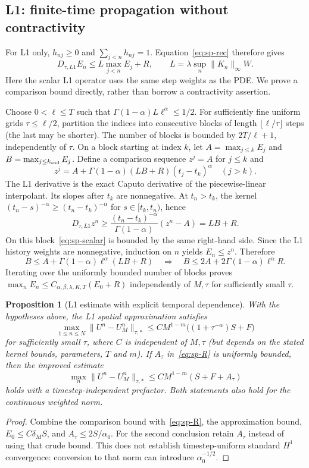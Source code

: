\documentclass[11pt,a4paper]{amsart}
\theoremstyle{remark}
\theoremstyle{plain}
\newtheorem{proposition}{Proposition}[section]
\theoremstyle{remark}
\numberwithin{equation}{section}
\begin{document}
\subsection{L1: finite-time propagation without contractivity}
For L1 only, $h_{nj}\ge0$ and $\sum_{j<n}h_{nj}=1$. Equation~\eqref{eq:sp-rec} therefore gives
\begin{equation}\label{eq:sp-scalar}
 D_{\tau,L1}E_n\le L\max_{j<n}E_j+R,\qquad L=\lambda\sup_n\|K_n\|_\infty W.
\end{equation}
Here the scalar L1 operator uses the same step weights as the PDE. We prove a comparison bound directly, rather than borrow a contractivity assertion.

Choose $0<\ell\le T$ such that $\Gamma(1-\alpha)L\ell^\alpha\le1/2$. For sufficiently fine uniform grids $\tau\le\ell/2$, partition the indices into consecutive blocks of length $\lfloor\ell/\tau\rfloor$ steps (the last may be shorter). The number of blocks is bounded by $2T/\ell+1$, independently of $\tau$. On a block starting at index $k$, let $A=\max_{j\le k}E_j$ and $B=\max_{j\le k_{\rm end}}E_j$. Define a comparison sequence $z^j=A$ for $j\le k$ and
\[
 z^j=A+\Gamma(1-\alpha)(LB+R)(t_j-t_k)^\alpha\quad(j>k).
\]
The L1 derivative is the exact Caputo derivative of the piecewise-linear interpolant. Its slopes after $t_k$ are nonnegative. At $t_n>t_k$, the kernel $(t_n-s)^{-\alpha}\ge(t_n-t_k)^{-\alpha}$ for $s\in[t_k,t_n)$, hence
\[
 D_{\tau,L1}z^n\ge\frac{(t_n-t_k)^{-\alpha}}{\Gamma(1-\alpha)}(z^n-A)=LB+R.
\]
On this block~\eqref{eq:sp-scalar} is bounded by the same right-hand side. Since the L1 history weights are nonnegative, induction on $n$ yields $E_n\le z^n$. Therefore
\[
 B\le A+\Gamma(1-\alpha)\ell^\alpha(LB+R)
 \quad\Longrightarrow\quad B\le2A+2\Gamma(1-\alpha)\ell^\alpha R.
\]
Iterating over the uniformly bounded number of blocks proves $\max_nE_n\le C_{\alpha,\beta,\lambda,K,T}(E_0+R)$ independently of $M,\tau$ for sufficiently small $\tau$.

\begin{proposition}[L1 estimate with explicit temporal dependence]\label{prop:sp-l1}
With the hypotheses above, the L1 spatial approximation satisfies
\[
 \max_{1\le n\le N}\|U^n-U_M^n\|_{\tau,*}
 \le C M^{1-m}\bigl((1+\tau^{-\alpha})S+F\bigr)
\]
for sufficiently small $\tau$, where $C$ is independent of $M,\tau$ (but depends on the stated kernel bounds, parameters, $T$ and $m$). If $A_\tau$ in~\eqref{eq:sp-R} is uniformly bounded, then the improved estimate
\[
 \max_n\|U^n-U_M^n\|_{\tau,*}\le CM^{1-m}(S+F+A_\tau)
\]
holds with a timestep-independent prefactor. Both statements also hold for the continuous weighted norm.
\end{proposition}
\begin{proof}
Combine the comparison bound with~\eqref{eq:sp-R}, the approximation bound, $E_0\le C\delta_M S$, and $A_\tau\le2S/\alpha_0$. For the second conclusion retain $A_\tau$ instead of using that crude bound. This does not establish timestep-uniform standard $H^1$ convergence: conversion to that norm can introduce $\alpha_0^{-1/2}$.
\end{proof}
\end{document}
